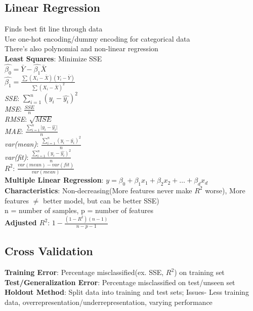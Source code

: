 \documentclass{article}
\begin{document}
\begin{multicols*}{2}
        \subsection*{Linear Regression}
        Finds best fit line through data\\
        Use one-hot encoding/dummy encoding for categorical data\\
        There's also polynomial and non-linear regression\\
        \textbf{Least Squares}: Minimize SSE\\
        $\hat{\beta_0} = \bar{Y} - \hat{\beta_1}\bar{X}$\\
        $\hat{\beta_1} = \frac{\sum (X_i - \bar{X})(Y_i - \bar{Y})}{\sum (X_i - \bar{X})^2}$\\
        \textit{SSE}: $\sum_{i=1}^{n} (y_i - \hat{y_i})^2$\\
        \textit{MSE}: $\frac{SSE}{n}$\\
        \textit{RMSE}: $\sqrt{MSE}$\\
        \textit{MAE}: $\frac{\sum_{i=1}^{n} \lvert y_i - \hat{y_i} \rvert}{n}$\\
        \textit{var(mean)}: $\frac{\sum_{i=1}^{n} (y_i - \bar{y_i})^2}{n}$\\
        \textit{var(fit)}: $\frac{\sum_{i=1}^{n} (y_i - \hat{y_i})^2}{n}$\\
        \textit{$R^2$}: $\frac{var(mean) - var(fit)}{var(mean)}$\\
        \textbf{Multiple Linear Regression}: $y = \beta_0 + \beta_1 x_1 + \beta_2 x_2 + \ldots +
        \beta_d x_d$\\
        \textbf{Characteristics}: Non-decreasing(More features never make $R^2$ worse), More
        features $\neq$ better model, but can be better SSE)\\
        n = number of samples, p = number of features\\
        \textbf{Adjusted $R^2$}: $1 - \frac{(1 - R^2)(n - 1)}{n - p - 1}$\\
        \subsection*{Cross Validation}
        \textbf{Training Error}: Percentage misclassified(ex. SSE, $R^2$) on training set\\
        \textbf{Test/Generalization Error}: Percentage misclassified on test/unseen set\\
        \textbf{Holdout Method}: Split data into training and test sets; Issues- Less training
        data, overrepresentation/underrepresentation, varying performance\\

\end{multicols*}
\end{document}
